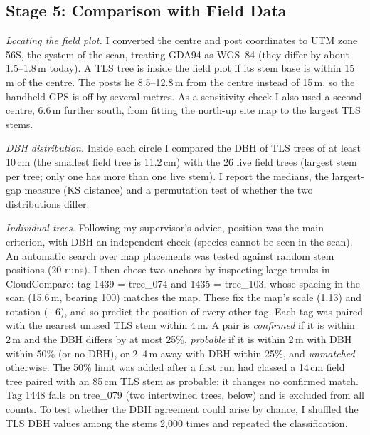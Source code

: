 \documentclass[runningheads]{llncs}
\begin{document}
\subsection{Stage 5: Comparison with Field Data}\label{sec:valid}
\emph{Locating the field plot.} I converted the centre and post coordinates to UTM zone 56S, the system of the scan, treating GDA94 as WGS~84 (they differ by about 1.5--1.8\,m today). A TLS tree is inside the field plot if its stem base is within 15\,m of the centre. The posts lie 8.5--12.8\,m from the centre instead of 15\,m, so the handheld GPS is off by several metres. As a sensitivity check I also used a second centre, 6.6\,m further south, from fitting the north-up site map to the largest TLS stems.

\emph{DBH distribution.} Inside each circle I compared the DBH of TLS trees of at least 10\,cm (the smallest field tree is 11.2\,cm) with the 26 live field trees (largest stem per tree; only one has more than one live stem). I report the medians, the largest-gap measure (KS distance) and a permutation test of whether the two distributions differ.

\emph{Individual trees.} Following my supervisor's advice, position was the main criterion, with DBH an independent check (species cannot be seen in the scan). An automatic search over map placements was tested against random stem positions (20 runs). I then chose two anchors by inspecting large trunks in CloudCompare: tag 1439 = tree\_074 and 1435 = tree\_103, whose spacing in the scan (15.6\,m, bearing 100\textdegree) matches the map. These fix the map's scale (1.13) and rotation ($-$6\textdegree), and so predict the position of every other tag. Each tag was paired with the nearest unused TLS stem within 4\,m. A pair is \emph{confirmed} if it is within 2\,m and the DBH differs by at most 25\%, \emph{probable} if it is within 2\,m with DBH within 50\% (or no DBH), or 2--4\,m away with DBH within 25\%, and \emph{unmatched} otherwise. The 50\% limit was added after a first run had classed a 14\,cm field tree paired with an 85\,cm TLS stem as probable; it changes no confirmed match. Tag 1448 falls on tree\_079 (two intertwined trees, below) and is excluded from all counts. To test whether the DBH agreement could arise by chance, I shuffled the TLS DBH values among the stems 2,000 times and repeated the classification.
\end{document}
